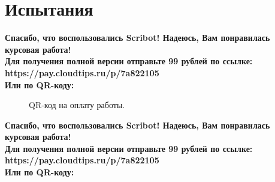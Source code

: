 \documentclass{article}
\begin{document}
\section{Испытания}
\begin{center}
    \textbf{
        Спасибо, что воспользовались Scribot! Надеюсь, Вам понравилась курсовая работа!\\
        Для получения полной версии отправьте 99 рублей по ссылке:\\
        https://pay.cloudtips.ru/p/7a822105\\
        Или по QR-коду:\\
    }
\end{center}
\begin{figure}[h]
    \caption{QR-код на оплату работы.}
    \label{ris:image}
\end{figure}
\newpage
\begin{center}
    \textbf{
        Спасибо, что воспользовались Scribot! Надеюсь, Вам понравилась курсовая работа!\\
        Для получения полной версии отправьте 99 рублей по ссылке:\\
        https://pay.cloudtips.ru/p/7a822105\\
        Или по QR-коду:\\
    }
\end{center}
\end{document}
